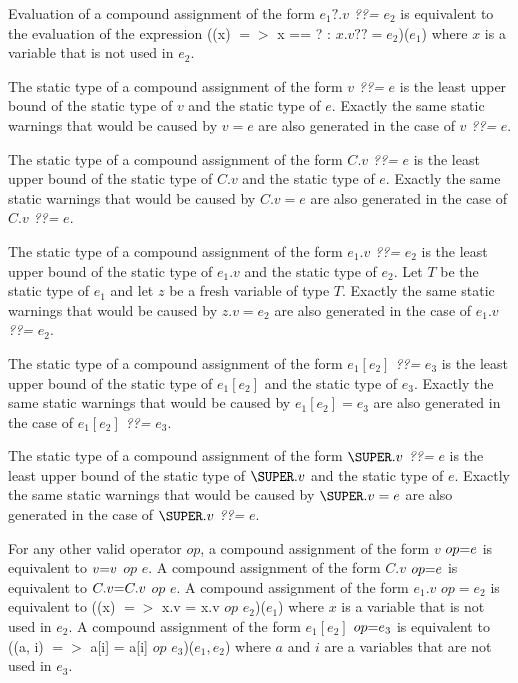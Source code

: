 \documentclass{article}
\newcommand{\code}[1]{{\sf #1}}
\begin{document}
\LMHash{}
Evaluation of a compound assignment of the form $e_1?.v$  {\em ??=} $e_2$ is equivalent to the evaluation of the expression \code{((x) $=>$ x == \NULL{} ?  \NULL: $x.v ??=  e_2$)($e_1$)} where $x$ is a variable that is not used in $e_2$. 


\LMHash{}
The static type of a compound assignment of the form $v$ {\em ??=} $e$ is the least upper bound of the static type of $v$ and the static type of $e$.  Exactly the same static warnings that would be caused by $v = e$ are also generated in the case of $v$ {\em ??=} $e$.


\LMHash{}
The static type of a compound assignment of the form  $C.v$ {\em ??=} $e$  is the least upper bound of the static type of $C.v$ and the static type of $e$.  Exactly the same static warnings that would be caused by $C.v = e$ are also generated in the case of $C.v$ {\em ??=} $e$.

\LMHash{}
The static type of a compound assignment of the form $e_1.v$  {\em ??=} $e_2$ is the least upper bound of the static type of $e_1.v$ and the static type of $e_2$. Let $T$ be the static type of $e_1$ and let $z$ be a fresh variable of type $T$. Exactly the same static warnings that would be caused by $z.v = e_2$ are also generated in the case of $e_1.v$  {\em ??=} $e_2$.

\LMHash{}
The static type of a compound assignment of the form $e_1[e_2]$  {\em ??=} $e_3$  is the least upper bound of the static type of $e_1[e_2]$ and the static type of $e_3$. Exactly the same static warnings that would be caused by $e_1[e_2] = e_3$ are also generated in the case of $e_1[e_2]$  {\em ??=} $e_3$.

\LMHash{}
The static type of a compound assignment of the form $\SUPER.v$  {\em ??=} $e$  is the least upper bound of the static type of $\SUPER.v$ and the static type of $e$. Exactly the same static warnings that would be caused by $\SUPER.v = e$ are also generated in the case of $\SUPER.v$  {\em ??=} $e$.

\LMHash{}
For any other valid operator $op$, a compound assignment of the form $v$ $op\code{=} e$ is equivalent to $v \code{=} v$ $op$ $e$. A compound assignment of the form $C.v$ $op \code{=} e$ is equivalent to $C.v \code{=} C.v$ $op$ $e$. A compound assignment of the form $e_1.v$ $op = e_2$ is equivalent to \code{((x) $=>$ x.v = x.v $op$ $e_2$)($e_1$)} where $x$ is a variable that is not used in $e_2$. A compound assignment of the form  $e_1[e_2]$ $op\code{=} e_3$ is equivalent to 
\code{((a, i) $=>$ a[i] = a[i] $op$ $e_3$)($e_1, e_2$)} where $a$ and $i$ are a variables that are not used in $e_3$. 
\end{document}
